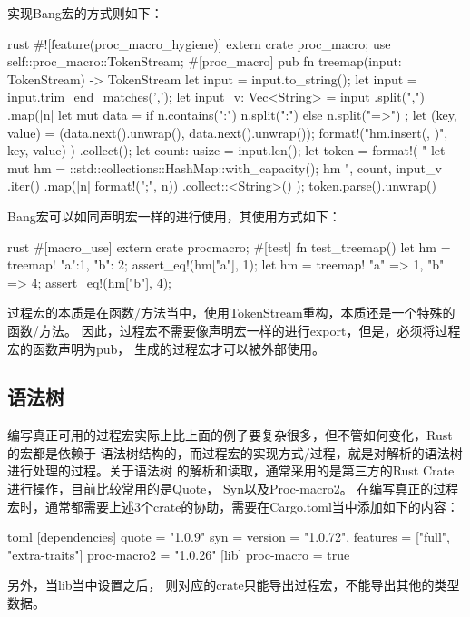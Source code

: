 实现Bang宏的方式则如下：
\begin{code-block}{rust}
#![feature(proc_macro_hygiene)]
extern crate proc_macro;
use self::proc_macro::TokenStream;
#[proc_macro]
pub fn treemap(input: TokenStream) -> TokenStream {
    let input = input.to_string();
    let input = input.trim_end_matches(',');
    let input_v: Vec<String> = input
        .split(",")
        .map(|n| {
            let mut data = if n.contains(":") {
                n.split(":")
            } else {
                n.split("=>")
            };
            let (key, value) = (data.next().unwrap(), data.next().unwrap());
            format!("hm.insert({}, {})", key, value)
        })
        .collect();
    let count: usize = input.len();
    let token = format!(
        "{{
        let mut hm = ::std::collections::HashMap::with_capacity({});
        {}
        hm
    }}",
        count,
        input_v
            .iter()
            .map(|n| format!("{};", n))
            .collect::<String>()
    );
    token.parse().unwrap()
}
\end{code-block}

Bang宏可以如同声明宏一样的进行使用，其使用方式如下：
\begin{code-block}{rust}
#[macro_use]
extern crate procmacro;
#[test]
fn test_treemap() {
    let hm = treemap! {"a":1, "b": 2};
    assert_eq!(hm["a"], 1);
    let hm = treemap! {"a" => 1, "b" => 4};
    assert_eq!(hm["b"], 4);
}
\end{code-block}

过程宏的本质是在函数/方法当中，使用TokenStream重构，本质还是一个特殊的函数/方法。
因此，过程宏不需要像声明宏一样的进行export，但是，必须将过程宏的函数声明为pub，
生成的过程宏才可以被外部使用。

\subsection{语法树}
编写真正可用的过程宏实际上比上面的例子要复杂很多，但不管如何变化，Rust的宏都是依赖于
语法树结构的，而过程宏的实现方式/过程，就是对解析的语法树进行处理的过程。关于语法树
的解析和读取，通常采用的是第三方的Rust Crate进行操作，目前比较常用的是\href{https://github.com/dtolnay/quote}{Quote}，
\href{https://github.com/dtolnay/syn}{Syn}以及\href{https://github.com/alexcrichton/proc-macro2}{Proc-macro2}。
在编写真正的过程宏时，通常都需要上述3个crate的协助，需要在Cargo.toml当中添加如下的内容：
\begin{code-block}{toml}
[dependencies]
quote = "1.0.9"
syn = {version = "1.0.72", features = ["full", "extra-traits"]}
proc-macro2 = "1.0.26"
[lib]
proc-macro = true
\end{code-block}
另外，当lib当中设置之后，
则对应的crate只能导出过程宏，不能导出其他的类型数据。


